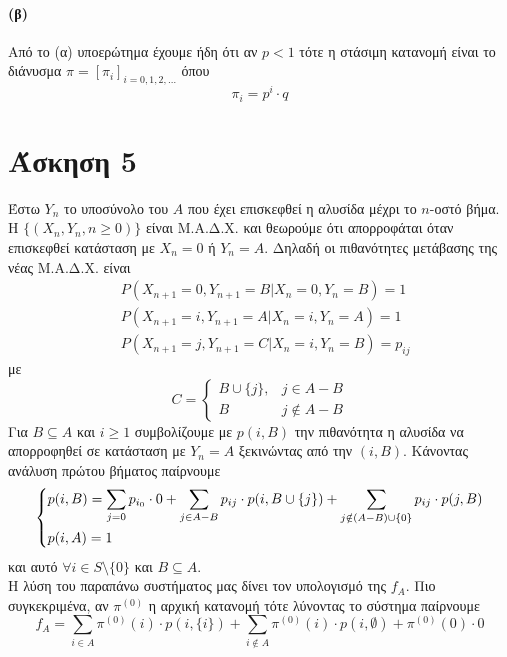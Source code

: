 \documentclass[a4paper,11pt]{article}
\begin{document}
\paragraph{(β)}
Από το (α) υποερώτημα έχουμε ήδη ότι αν $p<1$ τότε η στάσιμη κατανομή είναι το διάνυσμα $\pi = [\pi_i]_{i=0,1,2,\dots}$ όπου
\[\pi_i = p^i \cdot q\]

\pagebreak


\section*{Άσκηση 5}

Έστω $Y_n$ το υποσύνολο του $A$ που έχει επισκεφθεί η αλυσίδα μέχρι το $n$-οστό βήμα.\\
Η $\{(X_n,Y_n,n\geq 0)\}$ είναι Μ.Α.Δ.Χ. και θεωρούμε ότι απορροφάται όταν επισκεφθεί κατάσταση με $X_n=0$ ή $Y_n=A$.
Δηλαδή οι πιθανότητες μετάβασης της νέας Μ.Α.Δ.Χ. είναι
\begin{align*}
	&P(X_{n+1}=0,Y_{n+1}=B|X_n=0,Y_n=B) = 1\\
	&P(X_{n+1}=i,Y_{n+1}=A|X_n=i,Y_n=A) = 1\\
	&P(X_{n+1}=j,Y_{n+1}=C|X_n=i,Y_n=B) = p_{ij}
\end{align*}
με
\[C = \begin{cases}
	B \cup \{j\}, & j \in A-B\\
	B & j \notin A-B
\end{cases}\]
Για $B \subseteq A$ και $i \geq 1$ συμβολίζουμε με $p(i,B)$ την πιθανότητα η αλυσίδα να απορροφηθεί σε κατάσταση με $Y_n=A$ ξεκινώντας από την $(i,B)$.
Κάνοντας ανάλυση πρώτου βήματος παίρνουμε
\[
	\begin{dcases}
		p(i,B) = \sum_{j=0} p_{i_0} \cdot 0 + \sum_{j\in A-B} p_{ij} \cdot p(i,B\cup \{j\}) + \sum_{j\notin (A-B) \cup \{0\}} p_{ij} \cdot p(j,B)\\
		p(i,A) = 1
	\end{dcases}
\]
και αυτό $\forall i\in S \setminus \{0\}$ και $B \subseteq A$.
\\[8pt]
Η λύση του παραπάνω συστήματος μας δίνει τον υπολογισμό της $f_A$.
Πιο συγκεκριμένα, αν $\pi^{(0)}$ η αρχική κατανομή τότε λύνοντας το σύστημα παίρνουμε
\[
	f_A = \sum_{i\in A} \pi^{(0)}(i) \cdot p(i,\{i\}) + \sum_{i\notin A} \pi^{(0)}(i) \cdot p(i,\emptyset) + \pi^{(0)}(0) \cdot 0
\]
\end{document}
